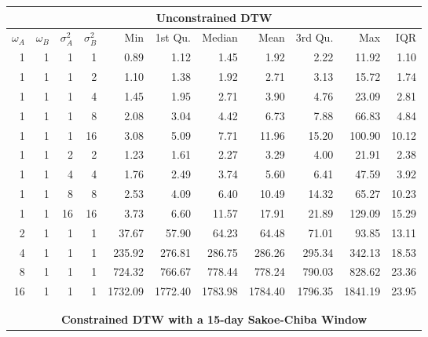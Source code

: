 \documentclass[12pt]{article}
\begin{document}
\begin{table}[!ht]
    \fontsize{10pt}{10pt}\selectfont
    \begin{center}
      \begin{tabular}{r r r r | r r r r r r r}
        \multicolumn{11}{c}{\textbf{Unconstrained DTW}} \\
        \midrule
        $\omega_{A}$ & $\omega_{B}$ & $\sigma^{2}_{A}$ & $\sigma^{2}_{B}$ & Min & 1st Qu. & Median & Mean & 3rd Qu. & Max & IQR \\
        \midrule
        1  & 1 & 1  & 1  &    0.89 &    1.12 &    1.45 &    1.92 &    2.22 &   11.92 &  1.10 \\
        \midrule
        1  & 1 & 1  & 2  &    1.10 &    1.38 &    1.92 &    2.71 &    3.13 &   15.72 &  1.74 \\
        1  & 1 & 1  & 4  &    1.45 &    1.95 &    2.71 &    3.90 &    4.76 &   23.09 &  2.81 \\
        1  & 1 & 1  & 8  &    2.08 &    3.04 &    4.42 &    6.73 &    7.88 &   66.83 &  4.84 \\
        1  & 1 & 1  & 16 &    3.08 &    5.09 &    7.71 &   11.96 &   15.20 &  100.90 & 10.12 \\
        \midrule
        1  & 1 & 2  & 2  &    1.23 &    1.61 &    2.27 &    3.29 &    4.00 &   21.91 &  2.38 \\
        1  & 1 & 4  & 4  &    1.76 &    2.49 &    3.74 &    5.60 &    6.41 &   47.59 &  3.92 \\
        1  & 1 & 8  & 8  &    2.53 &    4.09 &    6.40 &   10.49 &   14.32 &   65.27 & 10.23 \\
        1  & 1 & 16 & 16 &    3.73 &    6.60 &   11.57 &   17.91 &   21.89 &  129.09 & 15.29 \\
        \midrule
        2  & 1 & 1  & 1  &   37.67 &   57.90 &   64.23 &   64.48 &   71.01 &   93.85 & 13.11 \\
        4  & 1 & 1  & 1  &  235.92 &  276.81 &  286.75 &  286.26 &  295.34 &  342.13 & 18.53 \\
        8  & 1 & 1  & 1  &  724.32 &  766.67 &  778.44 &  778.24 &  790.03 &  828.62 & 23.36 \\
        16 & 1 & 1  & 1  & 1732.09 & 1772.40 & 1783.98 & 1784.40 & 1796.35 & 1841.19 & 23.95 \\
        \hline
        \\
        \\
        \multicolumn{11}{c}{\textbf{Constrained DTW with a 15-day Sakoe-Chiba Window}} \\

\end{tabular}
\end{center}
\end{table}
\end{document}

